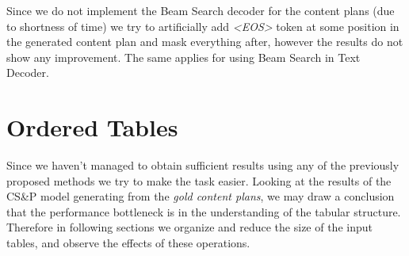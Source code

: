 \begin{table}[h]
    \centering
    \caption{Performance metrics on the Content Selection and Planning model.} \label{table:metrics_csap}
\end{table}
Since we do not implement the Beam Search decoder for the content plans (due to shortness of time) we try to artificially add \emph{\textless EOS\textgreater} token at some position in the generated content plan and mask everything after, however the results do not show any improvement. The same applies for using Beam Search in Text Decoder. 


\section{Ordered Tables}

Since we haven't managed to obtain sufficient results using any of the previously proposed methods we try to make the task easier. Looking at the results of the CS\&P model generating from the \emph{gold content plans}, we may draw a conclusion that the performance bottleneck is in the understanding of the tabular structure. Therefore in following sections we organize and reduce the size of the input tables, and observe the effects of these operations.

